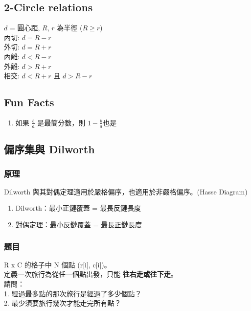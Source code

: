 \documentclass[10pt,oneside]{article}
\begin{document}
\begin{landscape}
\begin{multicols}{2}

\subsection{2-Circle relations}

{\normalsize 
$d$ = 圓心距, $R$, $r$ 為半徑 ($R \geq r$)\\
內切: $d = R - r$\\
外切: $d = R + r$\\
內離: $d < R - r$\\
外離: $d > R + r$\\
相交: $d < R + r$ 且 $d > R - r$
}

\subsection{Fun Facts}

{\normalsize 
\begin{enumerate}
	\item 如果 $\frac b a$ 是最簡分數，則 $1 - \frac b a$也是%
\end{enumerate}
}

\subsection{偏序集與 Dilworth}

\subsubsection{原理}
{\normalsize
Dilworth 與其對偶定理適用於嚴格偏序，也適用於非嚴格偏序。(Hasse Diagram)

\begin{enumerate}
	\item Dilworth：最小正鏈覆蓋 = 最長反鏈長度
	\item 對偶定理：最小反鏈覆蓋 = 最長正鏈長度
\end{enumerate}
}

\subsubsection{題目}

{\normalsize
R x C 的格子中 N 個點 (r[i], c[i])。\\
定義一次旅行為從任一個點出發，只能 \textbf{往右走或往下走}。\\
請問：\\
1. 經過最多點的那次旅行是經過了多少個點？\\
2. 最少須要旅行幾次才能走完所有點？ \\

}
\end{multicols}
\end{landscape}
\end{document}
